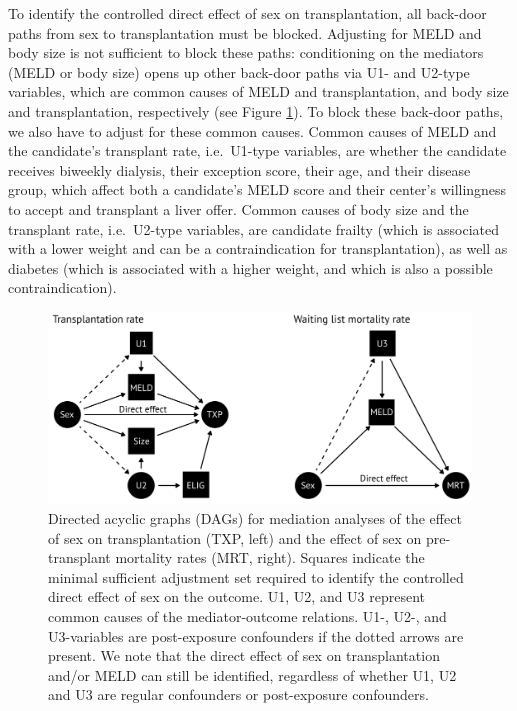 \documentclass[11pt,twoside,]{book}
\begin{document}
To identify the controlled direct effect of sex on transplantation, all back-door
paths from sex to transplantation must be blocked. Adjusting for MELD and body
size is not sufficient to block these paths: conditioning on the mediators
(MELD or body size) opens up other back-door paths via U1- and U2-type variables,
which are common causes of MELD and transplantation, and body size and transplantation,
respectively (see Figure \ref{fig:ch4fig1}). To block these back-door paths,
we also have to adjust for these common causes. Common causes of MELD and
the candidate's transplant rate, i.e.~U1-type variables, are whether the candidate
receives biweekly dialysis, their exception score, their age, and
their disease group, which affect both a candidate's MELD score and their center's
willingness to accept and transplant a liver offer. Common causes of body size
and the transplant rate, i.e.~U2-type variables, are candidate frailty
(which is associated with a lower weight and can be a contraindication for
transplantation), as well as diabetes (which is
associated with a higher weight, and which is also a possible contraindication).

\begin{figure}[ht]

{\centering \includegraphics[width=1\linewidth]{figures/ch4/fig1_plot_causal_models} 

}

\caption{Directed acyclic graphs (DAGs) for mediation analyses of the effect of sex on transplantation (TXP, left) and the effect of sex on pre-transplant mortality rates (MRT, right). Squares indicate the minimal sufficient adjustment set required to identify the controlled direct effect of sex on the outcome. U1, U2, and U3 represent common causes of the mediator-outcome relations. U1-, U2-, and U3-variables are post-exposure confounders
  if the dotted arrows are present. We note that the direct effect of sex on transplantation and/or MELD can still be identified, regardless of whether U1, U2 and U3 are regular confounders or post-exposure confounders.}\label{fig:ch4fig1}
\end{figure}
\end{document}
